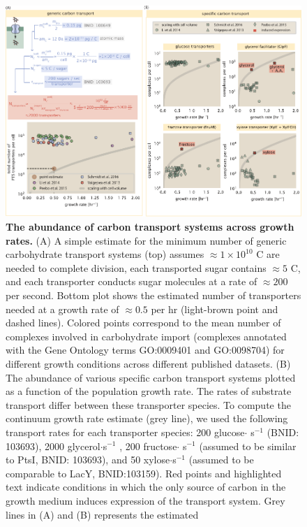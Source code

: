 \begin{figure}
    \begin{fullwidth}
    \includegraphics{main_figs/fig2_carbon_transport.pdf}
    \caption{\textbf{The abundance of carbon transport systems across growth
    rates.} (A) A simple estimate for the minimum number of generic carbohydrate
    transport systems (top) assumes $\approx 1 \times 10^{10}$ C are needed to complete
    division, each transported sugar contains $\approx 5$ C, and each
    transporter conducts sugar molecules at a rate of $\approx 200$ per second.
    Bottom plot shows the estimated number of transporters needed at a growth
    rate of $\approx 0.5 $ per hr (light-brown point and dashed lines).  Colored
    points correspond to the mean number of complexes involved in carbohydrate
    import (complexes annotated with the Gene Ontology terms GO:0009401 and
    GO:0098704) for different growth conditions across different published
    datasets. (B) The abundance of various specific carbon transport systems
    plotted as a function of the population growth rate. The rates of substrate
    transport differ between these transporter species. To compute the continuum
    growth rate estimate (grey line), we used the following transport rates for
    each transporter species: 200
    glucose$\cdot$ s$^{-1}$ (BNID: 103693),  2000 glycerol$\cdot$s$^{-1}$
    \citep{lu2003}, 200 fructose$\cdot$ s$^{-1}$ (assumed to be similar to PtsI,
    BNID: 103693), and 50 xylose$\cdot$s$^{-1}$ (assumed to be comparable to
    LacY, BNID:103159). Red points and highlighted text indicate conditions in
    which the only source of carbon in the growth medium induces expression of
    the transport system. Grey lines in (A) and (B) represents the estimated
}
\end{fullwidth}
\end{figure}

